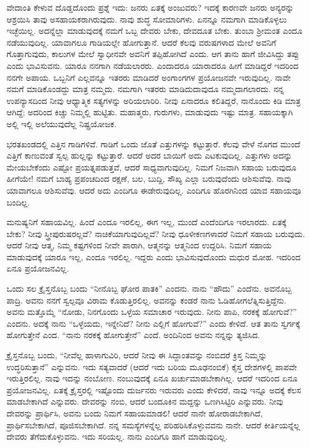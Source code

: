 ವೇದಾಂತಿ ಕೇಳುವ ದೊಡ್ಡದೊಂದು ಪ್ರಶ್ನೆ ಇದು: ಜನರು ಏತಕ್ಕೆ ಅಂಜುವರು? ಇದಕ್ಕೆ ಕಾರಣವೇ ಜನರು ಅನ್ಯರನ್ನು ಆಶ್ರಯಿಸಿ ತಾವು ಅಸಹಾಯಕರಾಗಿರುವುದು. ನಾವು ಶುದ್ಧ ಸೋಮಾರಿಗಳು. ಏನನ್ನೂ ನಮಗಾಗಿ ಮಾಡಿಕೊಳ್ಳಲು ಇಚ್ಛೆಯಿಲ್ಲ. ಅದನ್ನೆಲ್ಲಾ ಮಾಡುವುದಕ್ಕೆ ನಮಗೆ ಒಬ್ಬ ದೇವರು ಬೇಕು, ದೇವದೂತ ಬೇಕು. ತುಂಬಾ ಶ‍್ರೀಮಂತ ಎಂದೂ ನಡೆಯುವುದಿಲ್ಲ. ಯಾವಾಗಲೂ ಗಾಡಿಯಲ್ಲೇ ಹೋಗುತ್ತಾನೆ. ಆದರೆ ಕೆಲವು ವರುಷಗಳಾದ ಮೇಲೆ ಅವನಿಗೆ ಗೊತ್ತಾಗುವುದು, ಕಾಲುಗಳ ಮೇಲೆ ಸ್ವಾಧೀನವೇ ಅವನಿಗೆ ತಪ್ಪಿಹೋಗಿದೆ ಎಂದು. ಆಗ ತಾನು ಹಾಗೆ ಜೀವಿಸಿದ್ದು ತಪ್ಪು ಎಂದು ಭಾವಿಸುವನು. ಯಾರೂ ನನಗಾಗಿ ನಡೆಯಲಾರರು. ಎಂದಾದರೂ ಯಾರಾದರೂ ಹೀಗೆ ಮಾಡಿದ್ದರೆ ಇದರಿಂದ ನನಗೇ ಅಪಾಯ. ಒಬ್ಬನಿಗೆ ಎಲ್ಲವನ್ನೂ ಇತರರು ಮಾಡಿದರೆ ಅಂಗಾಂಗಗಳ ಪ್ರಯೋಜನವೇ ಇರುವುದಿಲ್ಲ. ನಾವೇ ನಮಗೆ ಮಾಡಿಕೊಂಡದ್ದು ಮಾತ್ರ ನಮ್ಮದು. ನಮಗಾಗಿ ಇತರರು ಮಾಡಿದುದಾವುದೂ ನಮ್ಮದಾಗಲಾರದು. ನನ್ನ ಉಪನ್ಯಾಸದಿಂದ ನೀವು ಆಧ್ಯಾತ್ಮಿಕ ಸತ್ಯಗಳನ್ನು ಅರಿಯಲಾರಿರಿ. ನೀವು ಏನಾದರೂ ಕಲಿತಿದ್ದರೆ, ನಾನೊಂದು ಕಿಡಿ ಮಾತ್ರ ಆಗಿದ್ದೆ; ಅದರಿಂದ ಕಿಚ್ಚು ನಿಮ್ಮಲ್ಲಿ ಹುಟ್ಟಿತು. ಮಹಾತ್ಮರು, ಗುರುಗಳು, ಮಾಡುವುದು ಇಷ್ಟು ಮಾತ್ರ. ಸಹಾಯಕ್ಕಾಗಿ ಅಲ್ಲಿ ಇಲ್ಲಿ ಅಲೆಯುವುದೆಲ್ಲ ನಿಷ್ಪ್ರಯೋಜಕ.

ಭರತಖಂಡದಲ್ಲಿ ಎತ್ತಿನ ಗಾಡಿಗಳಿವೆ. ಗಾಡಿಗೆ ಒಂದು ಜೊತೆ ಎತ್ತುಗಳನ್ನು ಕಟ್ಟುತ್ತಾರೆ. ಕೆಲವು ವೇಳೆ ನೊಗದ ಮುಂದೆ ಎತ್ತಿಗೆ ಕಾಣುವಂತೆ ಸ್ವಲ್ಪ ಹುಲ್ಲನ್ನು ಕಟ್ಟುತ್ತಾರೆ. ಆದರೆ ಅದರ ಬಾಯಿಗೆ ಅದು ಎಟಕುವುದಿಲ್ಲ. ಎತ್ತುಗಳು ಅದನ್ನು ಮೇಯಬೇಕೆಂದು ಎಷ್ಟೋ ಪ್ರಯತ್ನಪಡುತ್ತವೆ, ಆದರೆ ಸಾಧ್ಯವಾಗುವುದಿಲ್ಲ. ನಿಮಗೆ ನಿಜವಾಗಿ ಸಹಾಯ ಬರುವುದೂ ಹೀಗೆಯೇ! ನಮಗೆ ಬಾಹ್ಯ ಪ್ರಪಂಚದಿಂದ ರಕ್ಷಣೆ, ಬಲ, ಬುದ್ದಿ, ಸೌಖ್ಯ ಎಲ್ಲಾ ಬರುವುದೆಂದು ಆಶಿಸುವೆವು. ನಾವು ಯಾವಾಗಲೂ ಆಶಿಸುವೆವು. ಆದರೆ ಅದು ಎಂದಿಗೂ ಈಡೇರುವುದಿಲ್ಲ. ಎಂದಿಗೂ ಹೊರಗಿನಿಂದ ಯಾವ ಸಹಾಯವೂ ಬಂದಿಲ್ಲ.

ಮನುಷ್ಯನಿಗೆ ಸಹಾಯವಿಲ್ಲ. ಹಿಂದೆ ಎಂದೂ ಇರಲಿಲ್ಲ, ಈಗ ಇಲ್ಲ, ಮುಂದೆ ಎಂದೆಂದಿಗೂ ಇರಲಾರದು. ಏತಕ್ಕೆ ಬೇಕು? ನೀವು ಸ್ತ್ರೀಪುರುಷರಲ್ಲವೆ? ನಾಚಿಕೆಯಾಗುವುದಿಲ್ಲವೆ? ನೀವು ಧೂಳೀಕಣಗಳಾದರೆ ನಿಮಗೆ ಸಹಾಯ ಬರುವುದು. ಆದರೆ ನೀವು ಆತ್ಮ, ನಿಮ್ಮ ಕಷ್ಟಗಳಿಂದ ನೀವೇ ಪಾರಾಗಿ, ಆತ್ಮನನ್ನು ಆತ್ಮನಿಂದ ಉದ್ದರಿಸಿ. ನಿಮಗೆ ಸಹಾಯ ಮಾಡುವುದಕ್ಕೆ ಯಾರೂ ಇಲ್ಲ, ಎಂದೂ ಇರಲಿಲ್ಲ. ಇದ್ದರು ಎಂದು ಭಾವಿಸುವುದೊಂದು ಮಧುರ ಮೋಹ. ಇದರಿಂದ ಏನೂ ಪ್ರಯೋಜನವಿಲ್ಲ.

ಒಂದು ಸಲ ಕ್ರೈಸ್ತನೊಬ್ಬ ಬಂದು “ನೀನೊಬ್ಬ ಘೋರ ಪಾತಕಿ'' ಎಂದನು. ನಾನು “ಹೌದು” ಎಂದೆನು. ಅವನೊಬ್ಬ ಪಾದ್ರಿ. ಅವನು ನನಗೆ ಸ್ವಲ್ಪವೂ ವಿರಾಮ ಕೊಡುತ್ತಿರಲಿಲ್ಲ. ಅವನನ್ನು ಕಂಡರೆ ನಾನು ಓಡಿಹೋಗಲೆತ್ನಿಸುತ್ತಿದ್ದೆನು. ಅವನು ಮತ್ತೊಮ್ಮೆ “ನೋಡು, ನಿನಗೊಂದು ಒಳ್ಳೆಯ ಸಮಾಚಾರ ಇರುವುದು. ನೀನು ಪಾಪಿ, ನರಕಕ್ಕೆ ಹೋಗುವೆ?'' ಎಂದನು. ಅದಕ್ಕೆ ನಾನು “ಒಳ್ಳೆಯದು, ಇನ್ನೇನಿದೆ? ನೀನು ಎಲ್ಲಿಗೆ ಹೋಗುವೆ?” ಎಂದು ಕೇಳಿದೆ. ಆತ ತಾನು ಸ್ವರ್ಗಕ್ಕೆ ಹೋಗುತ್ತೇನೆ ಎಂದ. “ನಾನು ನರಕಕ್ಕೆ ಹೋಗುತ್ತೇನೆ'' ಎಂದೆ. ಅಂದಿನಿಂದ ಅವನು ನನ್ನನ್ನು ತ್ಯಜಿಸಿದ.

ಕ್ರೈಸ್ತನೊಬ್ಬ ಬಂದು, “ನೀವೆಲ್ಲ ಹಾಳಾಗುವಿರಿ, ಆದರೆ ನೀವು ಈ ಸಿದ್ದಾಂತವನ್ನು ನಂಬಿದರೆ ಕ್ರಿಸ್ತ ನಿಮ್ಮನ್ನು ಉದ್ಧರಿಸುತ್ತಾನೆ'' ಎನ್ನುವನು. ಇದು ಸತ್ಯವಾದರೆ (ಆದರೆ ಇದು ಬರಿಯ ಮೂಢನಂಬಿಕೆ) ಕೈಸ್ತ ದೇಶಗಳಲ್ಲಿ ಪಾಪವೇ ಇರುತ್ತಿರಲಿಲ್ಲ. ನಾವು ಇದನ್ನು ನಂಬೋಣ. ನಂಬುವುದಕ್ಕೆ ಏನೂ ಖರ್ಚುಮಾಡಬೇಕಾಗಿಲ್ಲ. ಆದರೆ ಇದರಿಂದ ಏನೂ ಪ್ರಯೋಜನವಿಲ್ಲ. ಏತಕ್ಕೆ ಕ್ರೈಸ್ತರಲ್ಲಿ ಇಷ್ಟೊಂದು ದುರ್ಜನರು ಇರುವರು ಎಂದು ಕೇಳಿದರೆ, ನಾವು ಇನ್ನೂ ಅದಕ್ಕೆ ಕೆಲಸ ಮಾಡಬೇಕಾಗಿದೆ ಎನ್ನುವರು. ದೇವರನ್ನು ನಂಬಿ, ಆದರೆ ಬಂದೂಕಿನ ಮದ್ದನ್ನು ಒಣಗಿಸಿಟ್ಟಿರಿ ಎನ್ನುವರು. ನೀವು ದೇವರನ್ನು ಪ್ರಾರ್ಥಿಸಿ, ಅವನು ಬಂದು ನಿಮಗೆ ಸಹಾಯಮಾಡಲಿ! ಆದರೆ ನಾನೇ ಹೋರಾಡಬೇಕಾಗಿದೆ, ಪ್ರಾರ್ಥಿಸಬೇಕಾಗಿದೆ, ಪೂಜಿಸಬೇಕಾಗಿದೆ. ನನ್ನ ಸಮಸ್ಯೆಗಳನ್ನೆಲ್ಲ ಪರಿಹರಿಸಿಕೊಳ್ಳುವವನು ನಾನೇ. ಆದರೆ ಕೀರ್ತಿಯನ್ನೆಲ್ಲ ದೇವರು ತೆಗೆದುಕೊಳ್ಳುವನು. ಇದು ಸರಿಯಲ್ಲ. ನಾನು ಎಂದಿಗೂ ಹಾಗೆ ಮಾಡುವುದಿಲ್ಲ.

